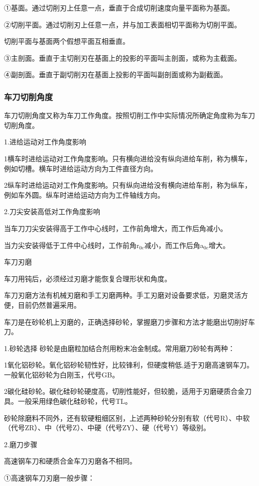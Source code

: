 \documentclass{ctexbook}
\begin{document}
①基面。通过切削刃上任意一点，垂直于合成切削速度向量平面称为基面。

②切削平面。通过切削刃上任意一点，并与加工表面相切平面称为切削平面。

切削平面与基面两个假想平面互相垂直。

③主剖面。垂直于主切削刃在基面上的投影的平面叫主剖面，或称为主截面。

④副剖面。垂直于副切削刃在基面上投影的平面叫副剖面或称为副截面。

\subsubsection{车刀切削角度}
车刀切削角度又称为车刀工作角度。按照切削工作中实际情况所确定角度称为车刀切削角度。

1.进给运动对工作角度影响

1横车时进给运动对工作角度影响。只有横向进给没有纵向进给车削，称为横车，例如切槽。横车时进给运动方向为工件直径方向。

2纵车时进给运动对工作角度影响。只有纵向进给没有横向进给车削，称为纵车，例如车外圆。纵车时进给运动方向为工件轴线方向。

2.刀尖安装高低对工作角度影响

当车刀刀尖安装得高于工作中心线时，工作前角增大，而工作后角减小。

当力尖安装得低于工件中心线时，工作前角r$_{0e}$减小，而工作后角a$_{0e}$增大。

车刀刃磨

车刀用钝后，必须经过刃磨才能恢复合理形状和角度。

车刀刃磨方法有机械刃磨和手工刃磨两种。手工刃磨对设备要求低，刃磨灵活方便，目前仍然普遍采用。

车刀是在砂轮机上刃磨的，正确选择砂轮，掌握磨刀步骤和方法才能磨出切削好车刀。

1.砂轮选择
砂轮是由磨粒加结合剂用粉末冶金制成。常用磨刀砂轮有两种：

1氧化铝砂轮。氧化铝砂轮韧性好，比较锋利，但硬度稍低,适于刃磨高速钢车刀。一般氧化铝砂轮为白刚玉，代号GB。

2碳化硅砂轮。碳化硅砂轮硬度高，切削性能好，但较脆，适用于刃磨硬质合金刀具。一般采用绿色碳化硅砂轮，代号TL。

砂轮除磨料不同外，还有软硬粗细区别，上述两种砂轮分别有软（代号R）、中软（代号ZR）、中（代号Z）、中硬（代号ZY）、硬（代号Y）等级别。

2.磨刀步骤

高速钢车刀和硬质合金车刀刃磨各不相同。

①高速钢车刀刃磨一般步骤：
\end{document}
